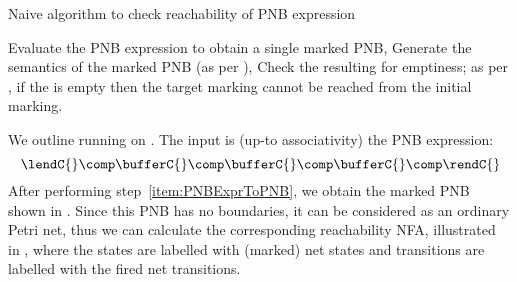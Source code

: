 \begin{algorithm}[ht]
    \caption{Naive algorithm to check reachability of PNB expression}\label{alg:naiveAlgorithm}
    \begin{algorithmic}[1]
        \State{}\label{item:PNBExprToPNB}Evaluate the PNB expression to obtain
            a single marked PNB,
        \State{}\label{item:PNBTo2NFA}Generate the \TNFA{} semantics of the
            marked PNB (as per ),
            \State{}Check the resulting \TNFA{} for emptiness; as per
            , if the \TNFA{} is
            empty then the target marking cannot be reached from the initial
            marking.
    \end{algorithmic}
\end{algorithm}

We outline running  on . The input is
(up-to associativity) the PNB expression:
\begin{equation}\label{eq:buf3}
    \lendC{} \comp
    \bufferC{} \comp
    \bufferC{} \comp
    \bufferC{} \comp
    \rendC{}
\end{equation}
After performing step~\ref{item:PNBExprToPNB}, we obtain the marked PNB shown
in . Since this PNB has no boundaries, it can be
considered as an ordinary Petri net, thus we can calculate the corresponding
reachability NFA, illustrated in , where the
states are labelled with (marked) net states and transitions are labelled with
the fired net transitions.

